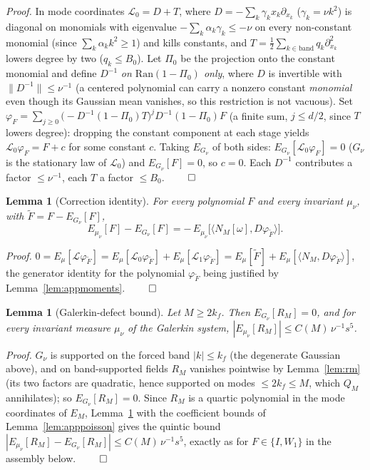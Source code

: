 \documentclass[11pt]{article}
\newtheorem{lemma}[theorem]{Lemma}
\theoremstyle{remark}
\theoremstyle{plain}
\begin{document}
\emph{Proof.} In mode coordinates $\mathcal{L}_0 = D + T$, where $D = -\sum_k\gamma_k x_k\partial_{x_k}$
($\gamma_k = \nu k^2$) is diagonal on monomials with eigenvalue $-\sum_k\alpha_k\gamma_k \le -\nu$ on
every non-constant monomial (since $\sum_k\alpha_k k^2 \ge 1$) and kills constants, and
$T = \tfrac12\sum_{k\in\text{band}}q_k\partial^2_{x_k}$ lowers degree by two ($q_k \le B_0$). Let
$\Pi_0$ be the projection onto the constant monomial and define $D^{-1}$ \emph{on
$\mathrm{Ran}(1-\Pi_0)$ only}, where $D$ is invertible with $\|D^{-1}\| \le \nu^{-1}$
(a centered polynomial can carry a nonzero constant \emph{monomial} even though its
Gaussian mean vanishes, so this restriction is not vacuous). Set
$\varphi_F = \sum_{j\ge0}\bigl(-D^{-1}(1-\Pi_0)T\bigr)^{j}D^{-1}(1-\Pi_0)F$
(a finite sum, $j \le d/2$, since $T$ lowers degree): dropping the constant component at
each stage yields $\mathcal{L}_0\varphi_F = F + c$ for some constant $c$. Taking
$E_{G_\nu}$ of both sides: $E_{G_\nu}[\mathcal{L}_0\varphi_F] = 0$ ($G_\nu$ is the
stationary law of $\mathcal{L}_0$) and $E_{G_\nu}[F] = 0$, so $c = 0$. Each $D^{-1}$
contributes a factor $\le\nu^{-1}$, each $T$ a factor $\le B_0$. $\qed$

\begin{lemma}[Correction identity]\label{lem:appcorr}
For every polynomial $F$ and every invariant $\mu_\nu$, with $\tilde F = F - E_{G_\nu}[F]$,
\begin{equation}
  E_{\mu_\nu}[F] - E_{G_\nu}[F] = -\,E_{\mu_\nu}\!\bigl[\langle N_M[\omega], D\varphi_{\tilde F}\rangle\bigr].
\end{equation}
\end{lemma}

\emph{Proof.} $0 = E_\mu[\mathcal{L}\varphi_{\tilde F}] = E_\mu[\mathcal{L}_0\varphi_{\tilde F}]
+ E_\mu[\mathcal{L}_1\varphi_{\tilde F}] = E_\mu[\tilde F] + E_\mu[\langle N_M,D\varphi_{\tilde F}\rangle]$,
the generator identity for the polynomial $\varphi_{\tilde F}$ being justified by
Lemma~\ref{lem:appmoments}. $\qed$

\begin{lemma}[Galerkin-defect bound]\label{lem:apprm}
Let $M \ge 2k_f$. Then $E_{G_\nu}[R_M] = 0$, and for every invariant measure $\mu_\nu$
of the Galerkin system, $|E_{\mu_\nu}[R_M]| \le C(M)\,\nu^{-1}s^5$.
\end{lemma}

\emph{Proof.} $G_\nu$ is supported on the forced band $|k| \le k_f$ (the degenerate
Gaussian above), and on band-supported fields $R_M$ vanishes pointwise by
Lemma~\ref{lem:rm} (its two factors are quadratic, hence supported on modes
$\le 2k_f \le M$, which $Q_M$ annihilates); so $E_{G_\nu}[R_M] = 0$. Since $R_M$ is a
quartic polynomial in the mode coordinates of $E_M$, Lemma~\ref{lem:appcorr} with the
coefficient bounds of Lemma~\ref{lem:apppoisson} gives the quintic bound
$|E_{\mu_\nu}[R_M] - E_{G_\nu}[R_M]| \le C(M)\,\nu^{-1}s^5$, exactly as for
$F \in \{I, W_1\}$ in the assembly below. $\qed$
\end{document}
